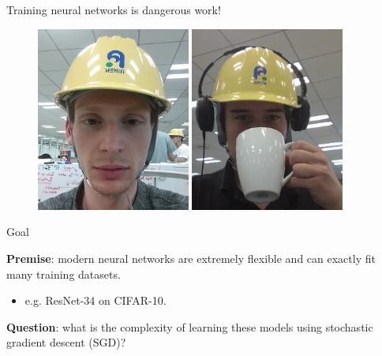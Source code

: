 \documentclass[mathserif,notheorems, hyperref={colorlinks, citecolor=blue, urlcolor=blue, linkcolor=blue}]{beamer}
\begin{document}
    \begin{frame}{Training neural networks is dangerous work!}
       
       \begin{figure}
            \centering
            \includegraphics[width=0.45\textwidth]{collaborators/helmet1} 
            \includegraphics[width=0.45\textwidth]{collaborators/helmet2} 
       \end{figure} 
    \end{frame}
   
    \begin{frame}{Goal}
        \Large 
        
        \textbf{Premise}: modern neural networks are extremely flexible and can exactly fit many training datasets. 
        \begin{itemize}
            \item e.g. ResNet-34 on CIFAR-10. 
        \end{itemize}        

        \vspace{4ex} 

        \textbf{Question}: what is the complexity of learning these models using stochastic gradient descent (SGD)?%
        
    \end{frame}
\end{document}

